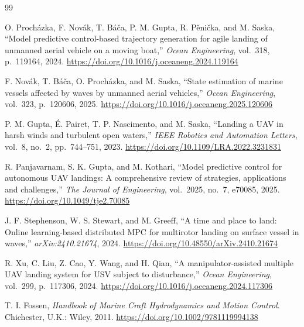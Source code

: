 \documentclass[12pt,a4paper]{report}
\begin{document}
\begin{thebibliography}{99}

 O. Proch\'azka, F. Nov\'ak, T. B\'a\v{c}a, P. M. Gupta, R. P\v{e}ni\v{c}ka, and M. Saska, ``Model predictive control-based trajectory generation for agile landing of unmanned aerial vehicle on a moving boat,'' \emph{Ocean Engineering}, vol.~318, p.~119164, 2024. \href{https://doi.org/10.1016/j.oceaneng.2024.119164}{https://doi.org/10.1016/j.oceaneng.2024.119164}

 F. Nov\'ak, T. B\'a\v{c}a, O. Proch\'azka, and M. Saska, ``State estimation of marine vessels affected by waves by unmanned aerial vehicles,'' \emph{Ocean Engineering}, vol.~323, p.~120606, 2025. \href{https://doi.org/10.1016/j.oceaneng.2025.120606}{https://doi.org/10.1016/j.oceaneng.2025.120606}

 P. M. Gupta, \'E. Pairet, T. P. Nascimento, and M. Saska, ``Landing a UAV in harsh winds and turbulent open waters,'' \emph{IEEE Robotics and Automation Letters}, vol.~8, no.~2, pp.~744--751, 2023. \href{https://doi.org/10.1109/LRA.2022.3231831}{https://doi.org/10.1109/LRA.2022.3231831}

 R. Panjavarnam, S. K. Gupta, and M. Kothari, ``Model predictive control for autonomous UAV landings: A comprehensive review of strategies, applications and challenges,'' \emph{The Journal of Engineering}, vol.~2025, no.~7, e70085, 2025. \href{https://doi.org/10.1049/tje2.70085}{https://doi.org/10.1049/tje2.70085}

 J. F. Stephenson, W. S. Stewart, and M. Greeff, ``A time and place to land: Online learning-based distributed MPC for multirotor landing on surface vessel in waves,'' \emph{arXiv:2410.21674}, 2024. \href{https://doi.org/10.48550/arXiv.2410.21674}{https://doi.org/10.48550/arXiv.2410.21674}

 R. Xu, C. Liu, Z. Cao, Y. Wang, and H. Qian, ``A manipulator-assisted multiple UAV landing system for USV subject to disturbance,'' \emph{Ocean Engineering}, vol.~299, p.~117306, 2024. \href{https://doi.org/10.1016/j.oceaneng.2024.117306}{https://doi.org/10.1016/j.oceaneng.2024.117306}

 T. I. Fossen, \emph{Handbook of Marine Craft Hydrodynamics and Motion Control}. Chichester, U.K.: Wiley, 2011. \href{https://doi.org/10.1002/9781119994138}{https://doi.org/10.1002/9781119994138}


\end{thebibliography}
\end{document}
